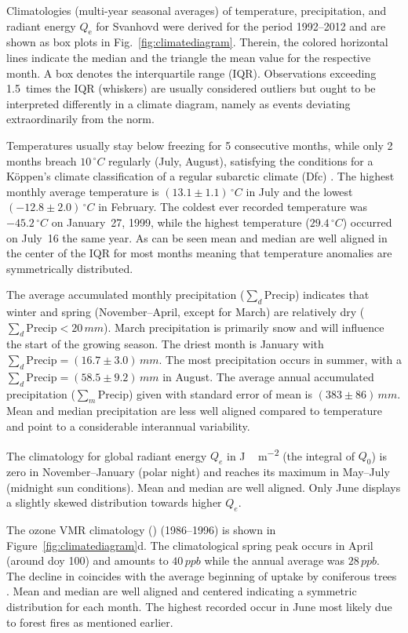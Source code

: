 \documentclass[bg, manuscript]{copernicus}
\begin{document}
Climatologies (multi-year seasonal averages) of temperature, precipitation, and radiant energy $Q_\mathrm{e}$ for Svanhovd were derived for the period 1992--2012 and are shown as box plots in Fig.~\ref{fig:climatediagram}. Therein, the colored horizontal lines indicate the median and the triangle the mean value for the respective month. A box denotes the interquartile range (IQR). Observations exceeding 1.5~times the IQR (whiskers) are usually considered outliers but ought to be interpreted differently in a climate diagram, namely as events deviating extraordinarily from the norm.

Temperatures usually stay below freezing for 5 consecutive months, while only 2 months breach $10\,\unit{^\circ C}$ regularly (July, August), satisfying the conditions for a K\"{o}ppen's climate classification of a regular subarctic climate (Dfc) \citep[e.g.][]{SD:Beck2018}. The highest monthly average temperature is $(13.1\pm 1.1)\,\unit{^\circ C}$ in July and the lowest $(-12.8\pm 2.0)\,\unit{^\circ C}$ in February. The coldest ever recorded temperature was $-45.2\,\unit{^\circ C}$ on January~27, 1999, while the highest temperature ($29.4\,\unit{^\circ C}$) occurred on July~16 the same year. As can be seen mean and median are well aligned in the center of the IQR for most months meaning that temperature anomalies are symmetrically distributed.

The average accumulated monthly precipitation ($\sum_d\mathrm{Precip}$) indicates that winter and spring (November--April, except for March) are relatively dry ($\sum_d\mathrm{Precip} < 20\,\unit{mm}$). March precipitation is primarily snow and will influence the start of the growing season. The driest month is January with $\sum_d\mathrm{Precip} = (16.7\pm 3.0)\,\unit{mm}$. The most precipitation occurs in summer, with a $\sum_d\mathrm{Precip} = (58.5\pm 9.2)\,\unit{mm}$ in August. The average annual accumulated precipitation ($\sum_m\mathrm{Precip}$) given with standard error of mean is $(383\pm 86)\,\unit{mm}$. Mean and median precipitation are less well aligned compared to temperature and point to a considerable interannual variability.

The climatology for global radiant energy $Q_e$ in \unit{J\,m^{-2}} (the integral of $Q_0$) is zero in November--January (polar night) and reaches its maximum in May--July (midnight sun conditions). Mean and median are well aligned. Only June displays a slightly skewed distribution towards higher $Q_e$.

The ozone VMR climatology () (1986--1996) is shown in Figure~\ref{fig:climatediagram}d. The climatological spring peak occurs in April (around \unit{doy} 100) and amounts to $40\,\unit{ppb}$ while the annual average  was $28\,\unit{ppb}$. The decline in  coincides with the average beginning of  uptake by coniferous trees \citep{TB:Kolari2007, TP:Wallin2013}. Mean and median are well aligned and centered indicating a symmetric distribution for each month. The highest recorded  occur in June most likely due to forest fires as mentioned earlier.
\end{document}
